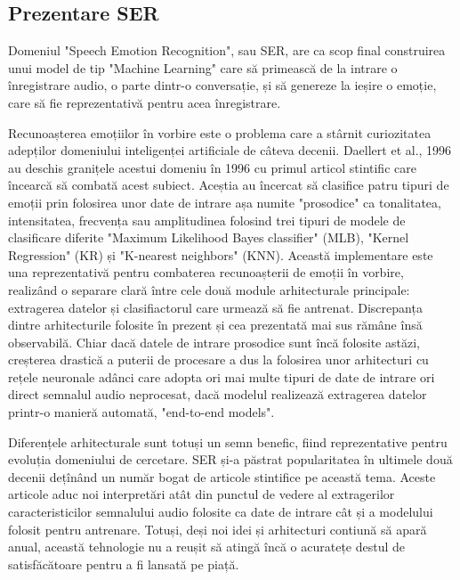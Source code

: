 \documentclass[a4paper,12pt]{book}
\begin{document}
			\subsection{Prezentare SER}
				Domeniul "Speech Emotion Recognition", sau SER, are ca scop final construirea unui model de tip "Machine Learning" care să primească de la intrare o înregistrare audio, o parte dintr-o conversație, și să genereze la ieșire o emoție, care să fie reprezentativă pentru acea înregistrare. \par
				Recunoașterea emoțiilor în vorbire este o problema care a stârnit curiozitatea adepților domeniului inteligenței artificiale de câteva decenii. Daellert et al., 1996 \cite{dellaert} au deschis granițele acestui domeniu în 1996 cu primul articol stintific care încearcă să combată acest subiect. Aceștia au încercat să clasifice patru tipuri de emoții prin folosirea unor date de intrare așa numite "prosodice" ca tonalitatea, intensitatea, frecvența sau amplitudinea folosind trei tipuri de modele de clasificare diferite "Maximum Likelihood Bayes classifier" (MLB), "Kernel Regression"  (KR) și "K-nearest neighbors" (KNN). Această implementare este una reprezentativă pentru combaterea recunoașterii de emoții în vorbire, realizând o separare clară între cele două module arhitecturale principale: extragerea datelor și clasifiactorul care urmează să fie antrenat. Discrepanța dintre arhitecturile folosite în prezent și cea prezentată mai sus rămâne însă observabilă. Chiar dacă datele de intrare prosodice sunt încă folosite astăzi, creșterea drastică a puterii de procesare a dus la folosirea unor arhitecturi cu rețele neuronale adânci care adopta ori mai multe tipuri de date de intrare ori direct semnalul audio neprocesat, dacă modelul realizează extragerea datelor printr-o manieră automată, "end-to-end models". \par		
				
				Diferențele arhitecturale sunt totuși un semn benefic, fiind reprezentative pentru evoluția domeniului de cercetare. SER și-a păstrat popularitatea în ultimele două decenii dețînând un număr bogat de articole stintifice pe această tema. Aceste articole aduc noi interpretări atât din punctul de vedere al extragerilor caracteristicilor semnalului audio folosite ca date de intrare cât și a modelului folosit pentru antrenare. Totuși, deși noi idei și arhitecturi contiună să apară anual, această tehnologie nu a reușit să atingă încă o acuratețe destul de satisfăcătoare pentru a fi lansată pe piață. \par
				
\end{document}

